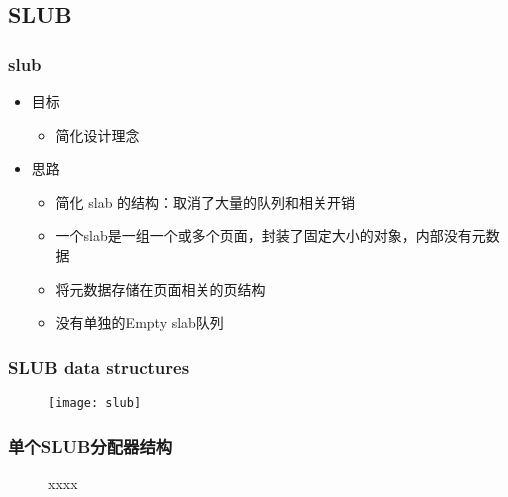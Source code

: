 \subsection{SLUB} %
\begin{frame}[plain,t]    
    \frametitle{slub}

    \begin{itemize}
        \item 目标

        \begin{itemize}
            \item 简化设计理念
        \end{itemize}
        \item 思路

        \begin{itemize}
            \item 简化 slab 的结构：取消了大量的队列和相关开销
            \item 一个slab是一组一个或多个页面，封装了固定大小的对象，内部没有元数据
            \item 将元数据存储在页面相关的页结构
            \item 没有单独的Empty slab队列
        \end{itemize}
    \end{itemize}
\end{frame}
\begin{frame}[plain,t]    
    \frametitle{SLUB data structures}
    \begin{figure}
        \centering
        \texttt{[image: slub]}
    \end{figure}
\end{frame}
\begin{frame}[plain,t]    
    \frametitle{单个SLUB分配器结构}
    \begin{figure}
        \centering
        \caption{xxxx}
    \end{figure}
\end{frame}


